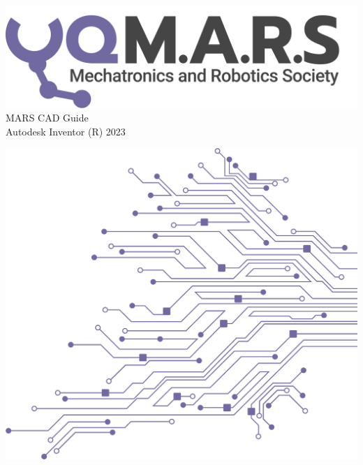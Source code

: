 \documentclass[a4paper,12pt]{report}
\begin{document}
\begin{titlepage}
    \begin{center}
        \vspace*{15mm}
        \includegraphics[width=0.7\paperwidth]{./assets/Logo (Dark).png} \\
        \vspace{1cm}
        \Huge MARS CAD Guide \\
        \huge \textcolor{turbo_purple}{Autodesk Inventor (R) 2023}
    \end{center}
    \vfill
    \includegraphics[height=0.5\paperheight, right]{./assets/Pattern - PCB (Solid).png}
    \vspace*{10mm}
\end{titlepage}
\restoregeometry
\newpage
\tableofcontents

\newpage
\end{document}

